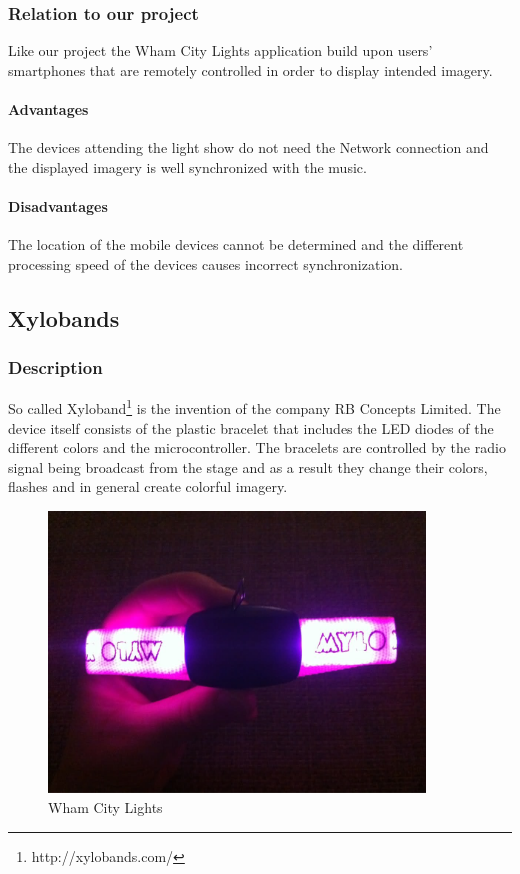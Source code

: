 \subsubsection{Relation to our project}
Like our project the Wham City Lights application build upon users' smartphones that are remotely controlled in order to display intended imagery. 

\paragraph{Advantages}
The devices attending the light show do not need the Network connection and the displayed imagery is well synchronized with the music.

\paragraph{Disadvantages}
The location of the mobile devices cannot be determined and the different processing speed of the devices causes incorrect synchronization.


\subsection{Xylobands}

\subsubsection{Description}
So called Xyloband\footnote{http://xylobands.com/} is the invention of the company RB Concepts Limited. The device itself consists of the plastic bracelet that includes the LED diodes of the different colors and the microcontroller. 
The bracelets are controlled by the radio signal being broadcast from the stage and as a result they change their colors, flashes and in general create colorful imagery.

\begin{figure}[!t]
	\centering
		\includegraphics[width=10cm]{preliminaryStudies/xylo.jpg}
	\caption{Wham City Lights}
	\label{fig:xylo}
\end{figure}

